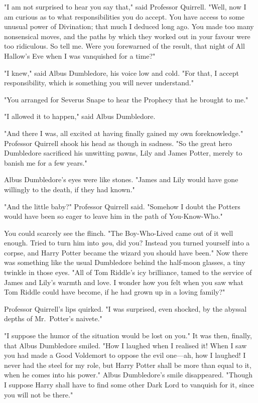 "I am not surprised to hear you say that," said Professor Quirrell. "Well, now
I am curious as to what responsibilities you do accept. You have access to some
unusual power of Divination; that much I deduced long ago. You made too many
nonsensical moves, and the paths by which they worked out in your favour were
too ridiculous. So tell me. Were you forewarned of the result, that night of
All Hallow's Eve when I was vanquished for a time?"

"I knew," said Albus Dumbledore, his voice low and cold. "For that, I accept
responsibility, which is something you will never understand."

"You arranged for Severus Snape to hear the Prophecy that he brought to me."

"I allowed it to happen," said Albus Dumbledore.

"And there I was, all excited at having finally gained my own foreknowledge."
Professor Quirrell shook his head as though in sadness. "So the great hero
Dumbledore sacrificed his unwitting pawns, Lily and James Potter, merely to
banish me for a few years."

Albus Dumbledore's eyes were like stones. "James and Lily would have gone
willingly to the death, if they had known."

"And the little baby?" Professor Quirrell said. "Somehow I doubt the Potters
would have been so eager to leave him in the path of You-Know-Who."

You could scarcely see the flinch. "The Boy-Who-Lived came out of it well
enough. Tried to turn him into \emph{you}, did you? Instead you turned yourself
into a corpse, and Harry Potter became the wizard you should have been." Now
there was something like the usual Dumbledore behind the half-moon glasses, a
tiny twinkle in those eyes. "All of Tom Riddle's icy brilliance, tamed to the
service of James and Lily's warmth and love. I wonder how you felt when you saw
what Tom Riddle could have become, if he had grown up in a loving family?"

Professor Quirrell's lips quirked. "I was surprised, even shocked, by the
abyssal depths of Mr.~Potter's naivete."

"I suppose the humor of the situation would be lost on you." It was then,
finally, that Albus Dumbledore smiled. "How I laughed when I realised it! When
I saw you had made a Good Voldemort to oppose the evil one---ah, how I laughed!
I never had the steel for my role, but Harry Potter shall be more than equal to
it, when he comes into his power." Albus Dumbledore's smile disappeared.
"Though I suppose Harry shall have to find some other Dark Lord to vanquish for
it, since you will not be there."

